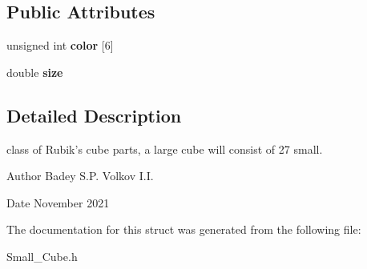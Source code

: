 \subsection*{Public Attributes}
\begin{DoxyCompactItemize}
\item 
\hypertarget{struct_small___cube_a7862e9e0ec259a21b75425610c56c5e2}{unsigned int {\bfseries color} \mbox{[}6\mbox{]}}\label{struct_small___cube_a7862e9e0ec259a21b75425610c56c5e2}

\item 
\hypertarget{struct_small___cube_a9ca6218982657c0d033d761f59ef12bf}{double {\bfseries size}}\label{struct_small___cube_a9ca6218982657c0d033d761f59ef12bf}

\end{DoxyCompactItemize}


\subsection{Detailed Description}
class of Rubik's cube parts, a large cube will consist of 27 small. 

\begin{DoxyAuthor}{Author}
Badey S.\-P. Volkov I.\-I. 
\end{DoxyAuthor}
\begin{DoxyDate}{Date}
November 2021 
\end{DoxyDate}


The documentation for this struct was generated from the following file\-:\begin{DoxyCompactItemize}
\item 
Small\-\_\-\-Cube.\-h\end{DoxyCompactItemize}
